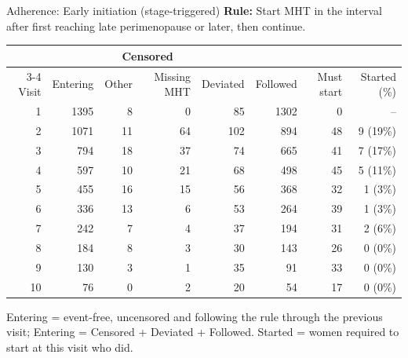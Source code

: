 \begin{frame}{Adherence: Early initiation (stage-triggered)}
\centering
{\small \textbf{Rule:} Start MHT in the interval after first reaching late perimenopause or later, then continue.}\par\vspace{6pt}
{\scriptsize
\begin{tabular}{r r r r r r r r}
\toprule
 & & \multicolumn{2}{c}{Censored} & & & & \\
\cmidrule(lr){3-4}
Visit & Entering & Other & Missing MHT & Deviated & Followed & Must start & Started (\%) \\
\midrule
1 & 1395 & 8 & 0 & 85 & 1302 & 0 & -- \\
2 & 1071 & 11 & 64 & 102 & 894 & 48 & 9 (19\%) \\
3 & 794 & 18 & 37 & 74 & 665 & 41 & 7 (17\%) \\
4 & 597 & 10 & 21 & 68 & 498 & 45 & 5 (11\%) \\
5 & 455 & 16 & 15 & 56 & 368 & 32 & 1 (3\%) \\
6 & 336 & 13 & 6 & 53 & 264 & 39 & 1 (3\%) \\
7 & 242 & 7 & 4 & 37 & 194 & 31 & 2 (6\%) \\
8 & 184 & 8 & 3 & 30 & 143 & 26 & 0 (0\%) \\
9 & 130 & 3 & 1 & 35 & 91 & 33 & 0 (0\%) \\
10 & 76 & 0 & 2 & 20 & 54 & 17 & 0 (0\%) \\
\bottomrule
\end{tabular}}
\par\vspace{6pt}
{\tiny Entering = event-free, uncensored and following the rule through the previous visit; Entering = Censored + Deviated + Followed. Started = women required to start at this visit who did.}
\end{frame}

